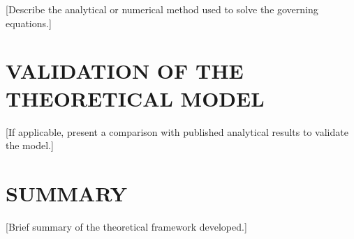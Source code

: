 [Describe the analytical or numerical method used to solve the
governing equations.]

\section{VALIDATION OF THE THEORETICAL MODEL}

[If applicable, present a comparison with published analytical
results to validate the model.]

\section{SUMMARY}

[Brief summary of the theoretical framework developed.]

